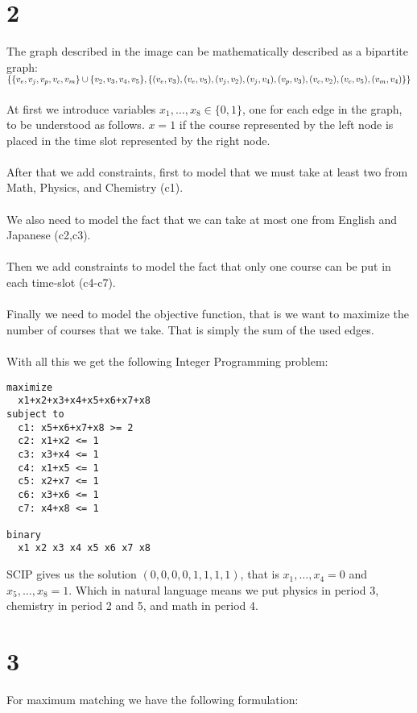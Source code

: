 \documentclass[12pt]{report}
\begin{document}
\section*{2}
The graph described in the image can be mathematically described as a bipartite graph: \\
$ \{ \{v_e,v_j,v_p,v_c,v_m\} \cup \{v_2,v_3,v_4,v_5 \},\\
    \{(v_e,v_3),(v_e,v_5),(v_j,v_2),(v_j,v_4),(v_p,v_3),(v_c,v_2),(v_c,v_5),(v_m,v_4)\}\}$ \\
\\
At first we introduce variables $x_1,\ldots,x_8 \in \{0,1\}$, one for each edge in the graph, to be understood as follows. $x=1$ if the course represented by the left node is placed in the time slot represented by the right node. 
\\
\\
After that we add constraints, first to model that we must take at least two from Math, Physics, and Chemistry (c1).
\\
\\
We also need to model the fact that we can take at most one from English and Japanese (c2,c3).
\\
\\
Then we add constraints to model the fact that only one course can be put in each time-slot (c4-c7).
\\ 
\\
Finally we need to model the objective function, that is we want to maximize the number of courses that we take. That is simply the sum of the used edges.
\\
\\
With all this we get the following Integer Programming problem: \\
\begin{verbatim}
maximize
  x1+x2+x3+x4+x5+x6+x7+x8
subject to
  c1: x5+x6+x7+x8 >= 2
  c2: x1+x2 <= 1
  c3: x3+x4 <= 1
  c4: x1+x5 <= 1
  c5: x2+x7 <= 1
  c6: x3+x6 <= 1
  c7: x4+x8 <= 1

binary
  x1 x2 x3 x4 x5 x6 x7 x8
\end{verbatim}

SCIP gives us the solution $(0,0,0,0,1,1,1,1)$, that is $x_1,\ldots,x_4 = 0$ and $x_5,\ldots,x_8 = 1$. Which in natural language means we put physics in period 3, chemistry in period 2 and 5, and math in period 4.

\section*{3}
For maximum matching we have the following formulation:
\end{document}
